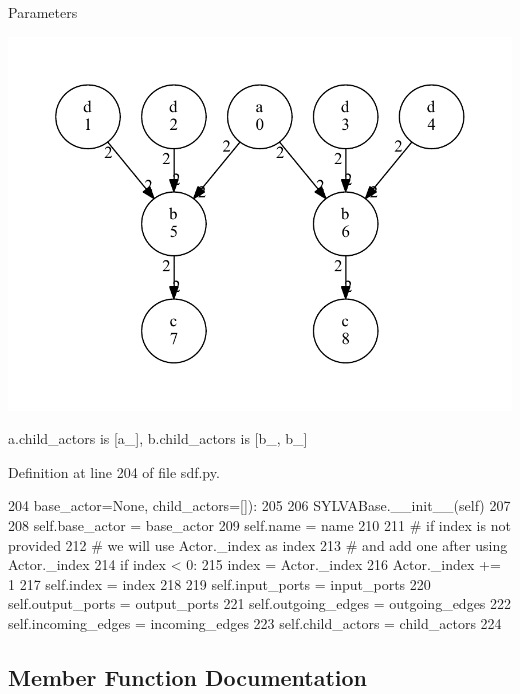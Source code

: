 \begin{DoxyParams}{Parameters}
\begin{DoxyImage}
\includegraphics[width=\textwidth,height=\textheight/2,keepaspectratio=true]{dot_HSDFG_example}
\end{DoxyImage}
 {\ttfamily a.\+child\+\_\+actors} is {\ttfamily \mbox{[}a\+\_\mbox{]}}, {\ttfamily b.\+child\+\_\+actors} is {\ttfamily \mbox{[}b\+\_, b\+\_\mbox{]}} \\
\hline
\end{DoxyParams}


Definition at line 204 of file sdf.\+py.


\begin{DoxyCode}
204                  base\_actor=\textcolor{keywordtype}{None}, child\_actors=[]):
205 
206         SYLVABase.\_\_init\_\_(self)
207 
208         self.base\_actor = base\_actor
209         self.name = name
210 
211         \textcolor{comment}{# if index is not provided}
212         \textcolor{comment}{# we will use Actor.\_index as index}
213         \textcolor{comment}{# and add one after using Actor.\_index}
214         \textcolor{keywordflow}{if} index < 0:
215             index = Actor.\_index
216             Actor.\_index += 1
217         self.index = index
218 
219         self.input\_ports = input\_ports
220         self.output\_ports = output\_ports
221         self.outgoing\_edges = outgoing\_edges
222         self.incoming\_edges = incoming\_edges
223         self.child\_actors = child\_actors
224 
\end{DoxyCode}


\subsection{Member Function Documentation}
\mbox{\label{classsylva_1_1base_1_1sdf_1_1_actor_a34ae46010635867a769f6907b46697d0}} 

